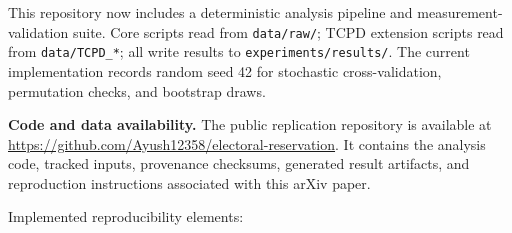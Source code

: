 \documentclass[
]{article}
\begin{document}
This repository now includes a deterministic analysis pipeline and measurement-validation suite. Core scripts read from \texttt{data/raw/}; TCPD extension scripts read from \texttt{data/TCPD\_*}; all write results to \texttt{experiments/results/}. The current implementation records random seed 42 for stochastic cross-validation, permutation checks, and bootstrap draws.

\textbf{Code and data availability.} The public replication repository is available at \href{https://github.com/Ayush12358/electoral-reservation}{\url{https://github.com/Ayush12358/electoral-reservation}}. It contains the analysis code, tracked inputs, provenance checksums, generated result artifacts, and reproduction instructions associated with this arXiv paper.

Implemented reproducibility elements:
\end{document}
